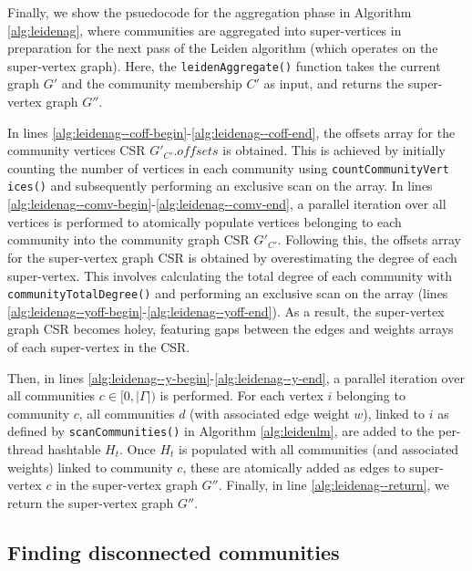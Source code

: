 Finally, we show the psuedocode for the aggregation phase in Algorithm \ref{alg:leidenag}, where communities are aggregated into super-vertices in preparation for the next pass of the Leiden algorithm (which operates on the super-vertex graph). Here, the \texttt{leidenAggregate()} function takes the current graph $G'$ and the community membership $C'$ as input, and returns the super-vertex graph $G''$.

In lines \ref{alg:leidenag--coff-begin}-\ref{alg:leidenag--coff-end}, the offsets array for the community vertices CSR $G'_{C'}.offsets$ is obtained. This is achieved by initially counting the number of vertices in each community using \texttt{countCommunityVert} \texttt{ices()} and subsequently performing an exclusive scan on the array. In lines \ref{alg:leidenag--comv-begin}-\ref{alg:leidenag--comv-end},  a parallel iteration over all vertices is performed to atomically populate vertices belonging to each community into the community graph CSR $G'_{C'}$. Following this, the offsets array for the super-vertex graph CSR is obtained by overestimating the degree of each super-vertex. This involves calculating the total degree of each community with \texttt{communityTotalDegree()} and performing an exclusive scan on the array (lines \ref{alg:leidenag--yoff-begin}-\ref{alg:leidenag--yoff-end}). As a result, the super-vertex graph CSR becomes holey, featuring gaps between the edges and weights arrays of each super-vertex in the CSR.

Then, in lines \ref{alg:leidenag--y-begin}-\ref{alg:leidenag--y-end}, a parallel iteration over all communities $c \in [0, |\Gamma|)$ is performed. For each vertex $i$ belonging to community $c$, all communities $d$ (with associated edge weight $w$), linked to $i$ as defined by \texttt{scanCommunities()} in Algorithm \ref{alg:leidenlm}, are added to the per-thread hashtable $H_t$. Once $H_t$ is populated with all communities (and associated weights) linked to community $c$, these are atomically added as edges to super-vertex $c$ in the super-vertex graph $G''$. Finally, in line \ref{alg:leidenag--return}, we return the super-vertex graph $G''$.




\subsection{Finding disconnected communities}

